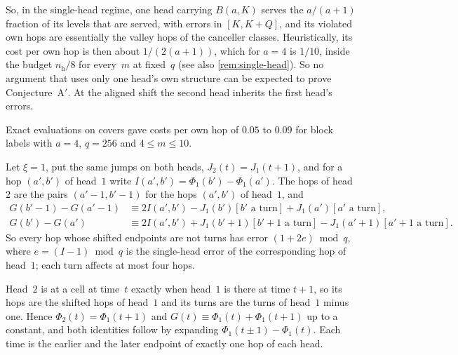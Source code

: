 So, in the single-head regime, one head carrying $B(a,K)$ serves the $a/(a+1)$ fraction of its levels that are served,
with errors in $[K,K+Q]$, and its violated own hops are essentially the valley hops of the canceller classes. Heuristically,
its cost per own hop is then about $1/(2(a+1))$, which for $a=4$ is $1/10$, inside the budget $n_{\mathrm h}/8$ for
every~$m$ at fixed~$q$ (see also \cref{rem:single-head}). So no argument that uses only one head's own structure can be
expected to prove Conjecture~A$'$. At the aligned shift the second head inherits the first head's errors.

\begin{remark}\label{rem:single-head}
Exact evaluations on covers gave costs per own hop of $0.05$ to $0.09$ for block labels with $a=4$, $q=256$ and
$4\le m\le10$.
\end{remark}

\begin{proposition}\label{prop:aligned}
\notformalized
Let $\xi=1$, put the same jumps on both heads, $J_2(t)=J_1(t+1)$, and for a hop $(a',b')$ of head~$1$ write
$I(a',b')=\Phi_1(b')-\Phi_1(a')$. The hops of head~$2$ are the pairs $(a'-1,b'-1)$ for the hops $(a',b')$ of head~$1$, and
\begin{align*}
  G(b'-1)-G(a'-1)&\equiv2I(a',b')-J_1(b')[b'\text{ a turn}]+J_1(a')[a'\text{ a turn}],\\
  G(b')-G(a')&\equiv2I(a',b')+J_1(b'+1)[b'+1\text{ a turn}]-J_1(a'+1)[a'+1\text{ a turn}].
\end{align*}
So every hop whose shifted endpoints are not turns has error $(1+2e)\bmod q$, where $e=(I-1)\bmod q$ is the single-head
error of the corresponding hop of head~$1$; each turn affects at most four hops.
\end{proposition}

\begin{informalproof}
Head~$2$ is at a cell at time~$t$ exactly when head~$1$ is there at time $t+1$, so its hops are the shifted hops of head~$1$
and its turns are the turns of head~$1$ minus one. Hence $\Phi_2(t)=\Phi_1(t+1)$ and $G(t)\equiv\Phi_1(t)+\Phi_1(t+1)$ up
to a constant, and both identities follow by expanding $\Phi_1(t\pm1)-\Phi_1(t)$. Each time is the earlier and the later
endpoint of exactly one hop of each head.
\end{informalproof}

